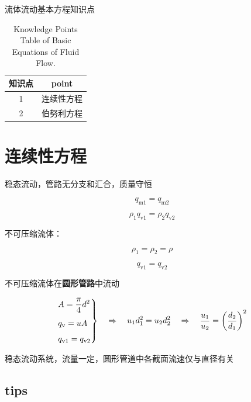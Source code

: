 \documentclass{book}
\DeclareRobustCommand{\bluebold}[1]{\textbf{\textcolor[rgb]{0.31,0.63,0.86}{#1}}}
\begin{document}
\tableofcontents
\clearpage


流体流动基本方程知识点

\begin{table}[htbp]
\centering
\begin{tabular}{c c} 
\toprule
知识点 & point\\ [0.5ex] 
\midrule
 1 & 连续性方程 \\
 2 & 伯努利方程 \\
\bottomrule
\end{tabular}
\caption{Knowledge Points Table of Basic Equations of Fluid Flow.}
\label{table:data}
\end{table}

\chapter{连续性方程}

稳态流动，管路无分支和汇合，质量守恒

\begin{equation}
q_\text{m1} = q_\text{m2}
\end{equation}

\begin{equation}
\rho_1 q_\text{v1} = \rho_2 q_\text{v2}
\end{equation}

不可压缩流体：

\begin{equation}
\rho_1 = \rho_2 = \rho
\end{equation}

\begin{equation}
q_\text{v1} = q_\text{v2}
\end{equation}

不可压缩流体在\bluebold{圆形管路}中流动

\begin{equation}
\begin{rcases}
\displaystyle A = \frac{\pi}{4} d^2 \\[4pt]
\displaystyle q_\text{v} = uA \\[4pt]
\displaystyle q_\text{v1} = q_\text{v2}
\end{rcases}
\quad
\Rightarrow
\quad
\displaystyle u_1 d_1^2 = u_2 d_2^2
\quad \Rightarrow \quad
\frac{u_1}{u_2} = \left(\frac{d_2}{d_1}\right)^2
\label{eq:continuity-set}
\end{equation}

稳态流动系统，流量一定，圆形管道中各截面流速仅与直径有关

\section*{tips}
\end{document}
